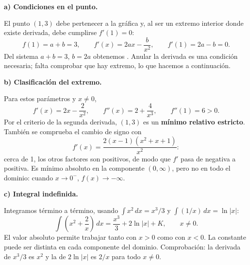 \textbf{a) Condiciones en el punto.}\par\nopagebreak[4]
El punto $(1,3)$ debe pertenecer a la gráfica y, al ser un extremo interior donde existe derivada, debe cumplirse $f'(1)=0$:
\[
f(1)=a+b=3,\qquad f'(x)=2ax-\frac{b}{x^2},\qquad f'(1)=2a-b=0.
\]
Del sistema $a+b=3$, $b=2a$ obtenemos . Anular la derivada es una condición necesaria; falta comprobar que hay extremo, lo que hacemos a continuación.

\textbf{b) Clasificación del extremo.}\par\nopagebreak[4]
Para estos parámetros y $x\ne0$,
\[
f'(x)=2x-\frac2{x^2},\qquad f''(x)=2+\frac4{x^3},\qquad f''(1)=6>0.
\]
Por el criterio de la segunda derivada, $(1,3)$ es un \textbf{mínimo relativo estricto}. También se comprueba el cambio de signo con
\[
f'(x)=\frac{2(x-1)(x^2+x+1)}{x^2}:
\]
cerca de 1, los otros factores son positivos, de modo que $f'$ pasa de negativa a positiva. Es mínimo absoluto en la componente $(0,\infty)$, pero no en todo el dominio: cuando $x\to0^-$, $f(x)\to-\infty$.

\textbf{c) Integral indefinida.}\par\nopagebreak[4]
Integramos término a término, usando $\int x^2\,dx=x^3/3$ y $\int (1/x)\,dx=\ln|x|$:
\[
\boxed{\int\left(x^2+\frac2x\right)\,dx=\frac{x^3}{3}+2\ln|x|+K,\qquad x\ne0.}
\]
El valor absoluto permite trabajar tanto con $x>0$ como con $x<0$. La constante puede ser distinta en cada componente del dominio. Comprobación: la derivada de $x^3/3$ es $x^2$ y la de $2\ln|x|$ es $2/x$ para todo $x\ne0$.
